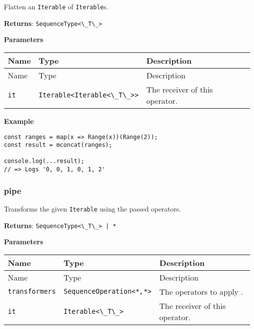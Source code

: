 Flatten an \passthrough{\lstinline!Iterable!} of
\passthrough{\lstinline!Iterable!}s.

\textbf{Returns}: \passthrough{\lstinline!SequenceType<\_T\_>!}

\textbf{Parameters}

\begin{longtable}[]{
  >{\raggedright\arraybackslash}p{}
  >{\raggedright\arraybackslash}p{}
  >{\raggedright\arraybackslash}p{}@{}}

\toprule\noalign{}
Name & Type & Description \\
\midrule\noalign{}
\endfirsthead
\toprule\noalign{}
Name & Type & Description \\
\midrule\noalign{}
\endhead
\bottomrule\noalign{}
\endlastfoot
\passthrough{\lstinline!it!} &
\passthrough{\lstinline!Iterable<Iterable<\_T\_>>!} & The receiver of
this operator. \\
\end{longtable}

\textbf{Example}

\begin{lstlisting}[label=4f37aea0-6d8f-468e-826f-2b141d150be7]
const ranges = map(x => Range(x))(Range(2));
const result = mconcat(ranges);
                                            
console.log(...result);
// => Logs '0, 0, 1, 0, 1, 2'
\end{lstlisting}

\hypertarget{de7946de-4204-4528-9d70-80292415d206}{%
\subsubsection{pipe}\label{de7946de-4204-4528-9d70-80292415d206}}

Transforms the given \passthrough{\lstinline!Iterable!} using the passed
operators.

\textbf{Returns}: \passthrough{\lstinline!SequenceType<\_T\_> | *!}

\textbf{Parameters}

\begin{longtable}[]{
  >{\raggedright\arraybackslash}p{}
  >{\raggedright\arraybackslash}p{}
  >{\raggedright\arraybackslash}p{}@{}}

\toprule\noalign{}
Name & Type & Description \\
\midrule\noalign{}
\endfirsthead
\toprule\noalign{}
Name & Type & Description \\
\midrule\noalign{}
\endhead
\bottomrule\noalign{}
\endlastfoot
\passthrough{\lstinline!transformers!} &
\passthrough{\lstinline!SequenceOperation<*!}\emph{\passthrough{\lstinline!,*!}}\passthrough{\lstinline!>!}
& The operators to apply . \\
\passthrough{\lstinline!it!} & \passthrough{\lstinline!Iterable<\_T\_>!}
& The receiver of this operator. \\
\end{longtable}

